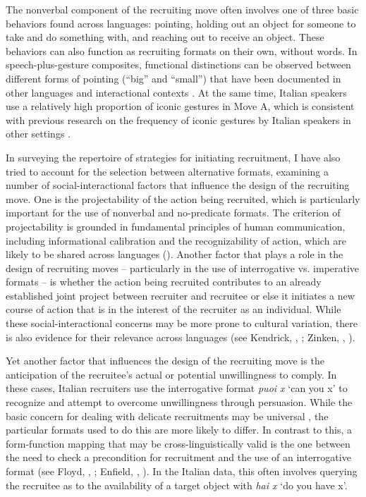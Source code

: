 \documentclass[output=paper,modfonts]{langscibook}
\begin{document}
The nonverbal component of the recruiting move often involves one of three basic behaviors found across languages: pointing, holding out an object for someone to take and do something with, and reaching out to receive an object. These behaviors can also function as recruiting formats on their own, without words. In speech-plus-gesture composites, functional distinctions can be observed between different forms of pointing (“big” and “small”) that have been documented in other languages and interactional contexts \citep{EnfieldKitaRuiter2007}. At the same time, Italian speakers use a relatively high proportion of iconic gestures in Move A, which is consistent with previous research on the frequency of iconic gestures by Italian speakers in other settings \citep{Campisi2014}.

In surveying the repertoire of strategies for initiating recruitment, I have also tried to account for the selection between alternative formats, examining a number of social-interactional factors that influence the design of the recruiting move. One is the projectability of the action being recruited, which is particularly important for the use of nonverbal and no-predicate formats. The criterion of projectability is grounded in fundamental principles of human communication, including informational calibration and the recognizability of action, which are likely to be shared across languages (\citealt{Grice1975,Clark1996,Levinson2000}). Another factor that plays a role in the design of recruiting moves -- particularly in the use of interrogative vs. imperative formats -- is whether the action being recruited contributes to an already established joint project between recruiter and recruitee or else it initiates a new course of action that is in the interest of the recruiter as an individual. While these social-interactional concerns may be more prone to cultural variation, there is also evidence for their relevance across languages (see Kendrick, , ; Zinken, , ). 

Yet another factor that influences the design of the recruiting move is the anticipation of the recruitee's actual or potential unwillingness to comply. In these cases, Italian recruiters use the interrogative format \textit{puoi x} ‘can you x’ to recognize and attempt to overcome unwillingness through persuasion. While the basic concern for dealing with delicate recruitments may be universal \citep{BrownLevinson1987}, the particular formats used to do this are more likely to differ. In contrast to this, a form-function mapping that may be cross-linguistically valid is the one between the need to check a precondition for recruitment and the use of an interrogative format (see Floyd, , ; Enfield, , ). In the Italian data, this often involves querying the recruitee as to the availability of a target object with \textit{hai x} ‘do you have x’. 
\end{document}
